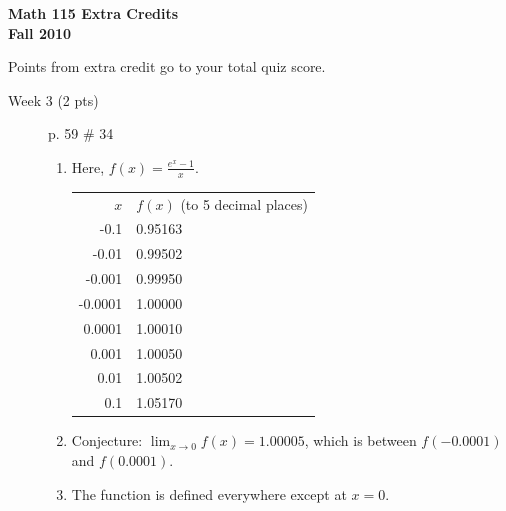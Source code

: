 \documentclass[11pt,letterpaper]{article}
\begin{document}
\flushleft
\begin{multicols}{2}


\begin{large}\textbf{Math 115 Extra Credits \\ \hfill Fall 2010     }\end{large}

\vspace{.5in}

\end{multicols}

\pagestyle{empty}

\flushleft

Points from extra credit go to your total quiz score.

\begin{description}
 \item[Week 3 (2 pts)] p. 59 \# 34
\begin{enumerate}
\renewcommand{\labelenumi}{(\alph{enumi})}
 \item Here, $f(x)=\frac{e^x-1}{x}$.

\vspace{.5pc}
\begin{tabular}{rl}
$x$ & $f(x)$ (to 5 decimal places) \\
-0.1 & 0.95163 \\
-0.01 & 0.99502 \\
-0.001 & 0.99950 \\
-0.0001 & 1.00000 \\
0.0001 & 1.00010 \\
0.001 & 1.00050\\
0.01 & 1.00502 \\
0.1 & 1.05170 \\
 \end{tabular}

\item Conjecture: $\lim_{x\rightarrow 0}f(x)=1.00005$, which is between $f(-0.0001)$ and $f(0.0001)$.

\item The function is defined everywhere except at $x=0$.


\end{enumerate}
\end{description}
\end{document}
